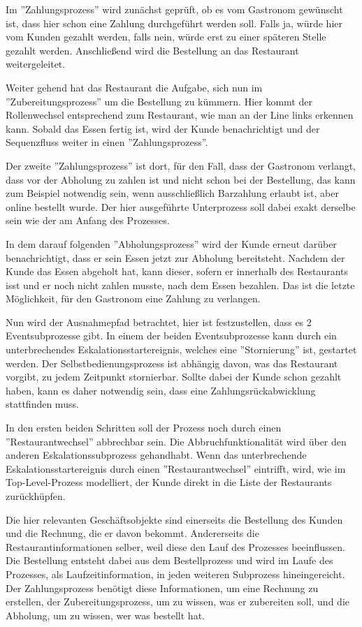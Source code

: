 Im ''Zahlungsprozess'' wird zunächst geprüft, ob es vom Gastronom gewünscht ist, dass hier schon eine Zahlung durchgeführt werden soll. Falls ja, würde hier vom Kunden gezahlt werden, falls nein, würde erst zu einer späteren Stelle gezahlt werden. Anschließend wird die Bestellung an das Restaurant weitergeleitet.

Weiter gehend hat das Restaurant die Aufgabe, sich nun im ''Zubereitungsprozess'' um die Bestellung zu kümmern. Hier kommt der Rollenwechsel entsprechend zum Restaurant, wie man an der Line links erkennen kann. Sobald das Essen fertig ist, wird der Kunde benachrichtigt und der Sequenzfluss weiter in einen ''Zahlungsprozess''. 

Der zweite ''Zahlungsprozess'' ist dort, für den Fall, dass der Gastronom verlangt, dass vor der Abholung zu zahlen ist und nicht schon bei der Bestellung, das kann zum Beispiel notwendig sein, wenn ausschließlich Barzahlung erlaubt ist, aber online bestellt wurde. Der hier ausgeführte Unterprozess soll dabei exakt derselbe sein wie der am Anfang des Prozesses.

In dem darauf folgenden ''Abholungsprozess'' wird der Kunde erneut darüber benachrichtigt, dass er sein Essen jetzt zur Abholung bereitsteht. Nachdem der Kunde das Essen abgeholt hat, kann dieser, sofern er innerhalb des Restaurants isst und er noch nicht zahlen musste, nach dem Essen bezahlen. Das ist die letzte Möglichkeit, für den Gastronom eine Zahlung zu verlangen.

Nun wird der Ausnahmepfad betrachtet, hier ist festzustellen, dass es 2 Eventsubprozesse gibt. In einem der beiden Eventsubprozesse kann durch ein unterbrechendes Eskalationsstartereignis, welches eine ''Stornierung'' ist, gestartet werden.  Der Selbstbedienungsprozess ist abhängig davon, was das Restaurant vorgibt, zu jedem Zeitpunkt stornierbar. Sollte dabei der Kunde schon gezahlt haben, kann es daher notwendig sein, dass eine Zahlungsrückabwicklung stattfinden muss. 

In den ersten beiden Schritten soll der Prozess noch durch einen ''Restaurantwechsel'' abbrechbar sein. Die Abbruchfunktionalität wird über den anderen Eskalationssubprozess gehandhabt. Wenn das unterbrechende Eskalationsstartereignis durch einen ''Restaurantwechsel'' eintrifft, wird, wie im Top-Level-Prozess modelliert, der Kunde  direkt in die Liste der Restaurants zurückhüpfen.

Die hier relevanten Geschäftsobjekte sind einerseits die Bestellung des Kunden und die Rechnung, die er davon bekommt. Andererseits die Restaurantinformationen selber, weil diese den Lauf des Prozesses beeinflussen. Die Bestellung entsteht dabei aus dem Bestellprozess und wird im Laufe des Prozesses, als Laufzeitinformation, in jeden weiteren Subprozess hineingereicht. Der Zahlungsprozess benötigt diese Informationen, um eine Rechnung zu erstellen, der Zubereitungsprozess, um zu wissen, was er zubereiten soll, und die Abholung, um zu wissen, wer was bestellt hat.

